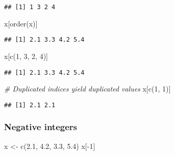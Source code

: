 \documentclass[
]{book}
\newenvironment{Shaded}{\begin{snugshade}}{\end{snugshade}}
\newcommand{\CommentTok}[1]{\textcolor[rgb]{0.56,0.35,0.01}{\textit{#1}}}
\newcommand{\DecValTok}[1]{\textcolor[rgb]{0.00,0.00,0.81}{#1}}
\newcommand{\FloatTok}[1]{\textcolor[rgb]{0.00,0.00,0.81}{#1}}
\newcommand{\FunctionTok}[1]{\textcolor[rgb]{0.00,0.00,0.00}{#1}}
\newcommand{\NormalTok}[1]{#1}
\newcommand{\OtherTok}[1]{\textcolor[rgb]{0.56,0.35,0.01}{#1}}
\newcommand{\SpecialCharTok}[1]{\textcolor[rgb]{0.00,0.00,0.00}{#1}}
\begin{document}
\begin{verbatim}
## [1] 1 3 2 4
\end{verbatim}

\begin{Shaded}
\begin{Highlighting}[]
\NormalTok{x[}\FunctionTok{order}\NormalTok{(x)]}
\end{Highlighting}
\end{Shaded}

\begin{verbatim}
## [1] 2.1 3.3 4.2 5.4
\end{verbatim}

\begin{Shaded}
\begin{Highlighting}[]
\NormalTok{x[}\FunctionTok{c}\NormalTok{(}\DecValTok{1}\NormalTok{, }\DecValTok{3}\NormalTok{, }\DecValTok{2}\NormalTok{, }\DecValTok{4}\NormalTok{)]}
\end{Highlighting}
\end{Shaded}

\begin{verbatim}
## [1] 2.1 3.3 4.2 5.4
\end{verbatim}

\begin{Shaded}
\begin{Highlighting}[]
\CommentTok{\# Duplicated indices yield duplicated values}
\NormalTok{x[}\FunctionTok{c}\NormalTok{(}\DecValTok{1}\NormalTok{, }\DecValTok{1}\NormalTok{)]}
\end{Highlighting}
\end{Shaded}

\begin{verbatim}
## [1] 2.1 2.1
\end{verbatim}

\hypertarget{negative-integers}{%
\subsubsection{Negative integers}\label{negative-integers}}

\begin{Shaded}
\begin{Highlighting}[]
\NormalTok{x }\OtherTok{\textless{}{-}} \FunctionTok{c}\NormalTok{(}\FloatTok{2.1}\NormalTok{, }\FloatTok{4.2}\NormalTok{, }\FloatTok{3.3}\NormalTok{, }\FloatTok{5.4}\NormalTok{)}
\NormalTok{x[}\SpecialCharTok{{-}}\DecValTok{1}\NormalTok{]}
\end{Highlighting}
\end{Shaded}
\end{document}
